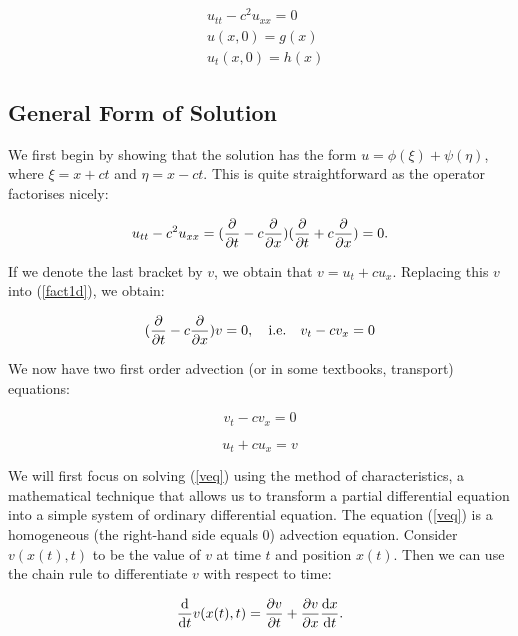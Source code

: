 \documentclass[12pt]{article}
\numberwithin{equation}{section}
\begin{document}
\begin{equation} \label{ivp1d}
    \begin{aligned}
    &u_{tt}-c^2u_{xx}=0\\
    &u(x,0)=g(x)\\
    &u_t(x,0)=h(x)
    \end{aligned}
\end{equation}

\subsection{General Form of Solution}

We first begin by showing that the solution has the form $u=\phi(\xi)+\psi(\eta)$, where $\xi=x+ct$ and $\eta=x-ct$. This is quite straightforward
as the operator factorises nicely:

\begin{equation} \label{fact1d}
    u_{tt}-c^2u_{xx}=(\diffp[1]{}{t} - c \diffp[1]{}{x})(\diffp[1]{}{t} + c \diffp[1]{}{x})=0.
\end{equation}

If we denote the last bracket by $v$, we obtain that $v=u_t+cu_x$. Replacing this $v$ into (\ref{fact1d}), we obtain:

\begin{equation*} 
    (\diffp[1]{}{t} -c \diffp[1]{}{x})v=0, \quad \textrm{i.e.} \quad v_t-cv_x=0
\end{equation*}

We now have two first order advection (or in some textbooks, transport) equations:

\begin{equation} 
    \label{veq}
    v_t-cv_x=0 
\end{equation}

\begin{equation}
    \label{ueq}
    u_t+cu_x=v 
\end{equation}

We will first focus on solving (\ref{veq}) using the method of characteristics, a mathematical technique that allows us to transform a partial differential
equation into a simple system of ordinary differential equation. \cite{Ev} The equation (\ref{veq}) is a homogeneous (the right-hand side equals $0$) 
advection equation. Consider $v(x(t),t)$ to be the value of $v$ at time $t$ and position $x(t)$. Then we can use the chain rule to differentiate
$v$ with respect to time:

\begin{equation} \label{diffv}
    \diff{}{t}v(x(t),t)=\diffp[1]{v}{t}+\diffp[1]{v}{x}\diff{x}{t}.
\end{equation}
\end{document}
